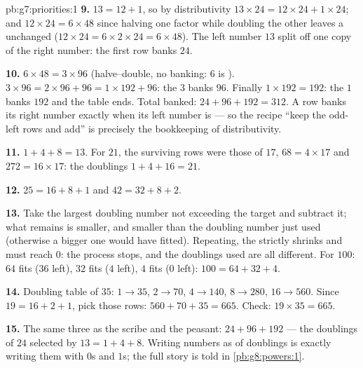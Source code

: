 \begin{solution}{pb:g7:priorities:1}
\textbf{9.} $13 = 12 + 1$, so by distributivity
$13 \times 24 = 12 \times 24 + 1 \times 24$; and
$12 \times 24 = 6 \times 48$ since halving one factor while
doubling the other leaves a  unchanged
($12 \times 24 = 6 \times 2 \times 24 = 6 \times 48$). The 
left number $13$ split off one copy of the right number: the
first row banks $24$.

\textbf{10.} $6 \times 48 = 3 \times 96$ (halve--double, no
banking: $6$ is ). $3 \times 96 = 2 \times 96 + 96 =
1 \times 192 + 96$: the  $3$ banks $96$. Finally
$1 \times 192 = 192$: the  $1$ banks $192$ and the table
ends. Total banked: $24 + 96 + 192 = 312$. A row banks its
right number exactly when its left number is  --- so the
recipe ``keep the odd-left rows and add'' is precisely the
bookkeeping of distributivity.

\textbf{11.} $1 + 4 + 8 = 13$. For $21$, the surviving rows were
those of $17$, $68 = 4 \times 17$ and $272 = 16 \times 17$: the
doublings $1 + 4 + 16 = 21$.

\textbf{12.} $25 = 16 + 8 + 1$ and $42 = 32 + 8 + 2$.

\textbf{13.} Take the largest doubling number not exceeding the
target and subtract it; what remains is smaller, and smaller
than the doubling number just used (otherwise a bigger one
would have fitted). Repeating, the  strictly shrinks
and must reach $0$: the process stops, and the doublings used
are all different. For $100$: $64$ fits ($36$ left), $32$ fits
($4$ left), $4$ fits ($0$ left): $100 = 64 + 32 + 4$.

\textbf{14.} Doubling table of $35$: $1 \to 35$, $2 \to 70$,
$4 \to 140$, $8 \to 280$, $16 \to 560$. Since
$19 = 16 + 2 + 1$, pick those rows:
$560 + 70 + 35 = 665$. Check: $19 \times 35 = 665$.

\textbf{15.} The same three as the scribe and the peasant:
$24 + 96 + 192$ --- the doublings of $24$ selected by
$13 = 1 + 4 + 8$. Writing numbers as  of doublings is
exactly writing them with $0$s and $1$s; the full story is told
in \cref{pb:g8:powers:1}.
\end{solution}
